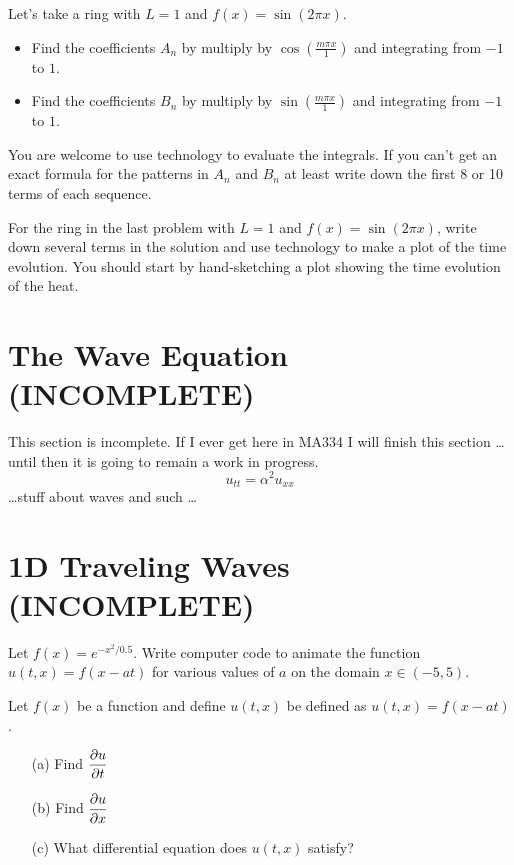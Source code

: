 \begin{problem}
    Let's take a ring with $L = 1$ and $f(x) = \sin(2 \pi x)$.  
    \begin{itemize}
        \item Find the coefficients $A_n$ by multiply by $\cos\left( \frac{m\pi x}{1}
            \right)$ and integrating from $-1$ to $1$.
        \item Find the coefficients $B_n$ by multiply by $\sin\left( \frac{m\pi x}{1}
            \right)$ and integrating from $-1$ to $1$.
    \end{itemize}
    You are welcome to use technology to evaluate the integrals.  If you can't get an
    exact formula for the patterns in $A_n$ and $B_n$ at least write down the first 8 or
    10 terms of each sequence.
\end{problem}

\begin{problem}
    For the ring in the last problem with $L=1$ and $f(x) = \sin(2\pi x)$, write down
    several terms in the solution and use technology to make a plot of the time evolution.
    You should start by hand-sketching a plot showing the time evolution of the heat.
\end{problem}



\newpage\section{The Wave Equation (INCOMPLETE)}
This section is incomplete. If I ever get here in MA334 I will finish this section \dots
until then it is going to remain a work in progress.
\[ u_{tt} = \alpha^2 u_{xx} \]
\ldots stuff about waves and such \ldots


\newpage\section{1D Traveling Waves (INCOMPLETE)}
\begin{problem}
    Let $f(x) = e^{-x^2/0.5}$.  Write computer code to animate the function $u(t,x) =
    f(x-at)$ for various values of $a$ on the domain $x \in (-5,5)$.
\end{problem}

\begin{problem}
    Let $f(x)$ be a function and define $u(t,x)$ be defined as $u(t,x) = f(x-at)$.  
    \begin{enumerate}
        \item[(a)] Find $\displaystyle \frac{\partial u}{\partial t}$
        \item[(b)] Find $\displaystyle \frac{\partial u}{\partial x}$
        \item[(c)] What differential equation does $u(t,x)$ satisfy?
    \end{enumerate}
\end{problem}
\solution{
    \[ u_t = -a u_x \]
}

